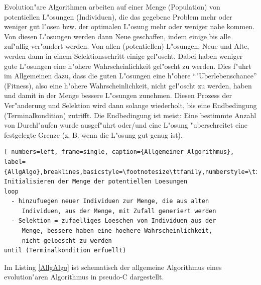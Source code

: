 Evolution"are Algorithmen arbeiten auf einer Menge (Population) von potentiellen L"osungen (Individuen), die das gegebene Problem mehr oder weniger gut l"osen bzw. der optimalen L"osung mehr oder weniger nahe kommen. Von diesen L"osungen werden dann Neue geschaffen, indem einige bis alle zuf"allig ver"andert werden. Von allen (potentiellen) L"osungen, Neue und Alte, werden dann in einem Selektionsschritt einige gel"oscht. Dabei haben weniger gute L"osungen eine h"ohere Wahrscheinlichkeit gel"oscht zu werden. Dies f"uhrt im Allgemeinen dazu, dass die guten L"osungen eine h"ohere ``"Uberlebenschance'' (Fitness), also eine h"ohere Wahrscheinlichkeit, nicht gel"oscht zu werden, haben und damit in der Menge bessere L"osungen zunehmen. Diesen Prozess der Ver"anderung und Selektion wird dann solange wiederholt, bis eine Endbedingung (Terminalkondition) zutrifft. Die Endbedingung ist meist: Eine bestimmte Anzahl von Durchl"aufen wurde ausgef"uhrt oder/und eine L"osung "uberschreitet eine festgelegte Grenze (z. B. wenn die L"osung gut genug ist).

\begin{lstlisting}[ numbers=left, frame=single, caption={Allgemeiner Algorithmus}, label={AllgAlgo},breaklines,basicstyle=\footnotesize\ttfamily,numberstyle=\tiny,extendedchars=true]
Initialisieren der Menge der potentiellen Loesungen
loop
  - hinzufuegen neuer Individuen zur Menge, die aus alten 
     Individuen, aus der Menge, mit Zufall generiert werden
  - Selektion = zufaelliges Loeschen von Individuen aus der 
     Menge, bessere haben eine hoehere Wahrscheinlichkeit,
     nicht geloescht zu werden
until (Terminalkondition erfuellt)
\end{lstlisting}

Im Listing \ref{AllgAlgo} ist schematisch der allgemeine Algorithmus eines evolution"aren Algorithmus in pseudo-C dargestellt.



